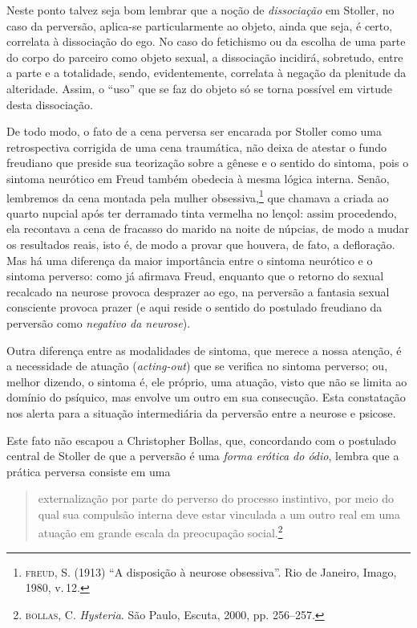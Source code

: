 Neste ponto talvez seja bom lembrar que a noção de \emph{dissociação} em
Stoller, no caso da perversão, aplica-se particularmente ao objeto,
ainda que seja, é certo, correlata à dissociação do ego. No caso do
fetichismo ou da escolha de uma parte do corpo do parceiro como objeto
sexual, a dissociação incidirá, sobretudo, entre a parte e a totalidade,
sendo, evidentemente, correlata à negação da plenitude da alteridade.
Assim, o ``uso'' que se faz do objeto só se torna possível em virtude
desta dissociação.

De todo modo, o fato de a cena perversa ser encarada por Stoller como
uma retrospectiva corrigida de uma cena traumática, não deixa de atestar
o fundo freudiano que preside sua teorização sobre a gênese e o sentido
do sintoma, pois o sintoma neurótico em Freud também obedecia à mesma
lógica interna. Senão, lembremos da cena montada pela mulher
obsessiva,\footnote{\textsc{freud}, S. (1913) ``A disposição à neurose
  obsessiva''.  Rio de Janeiro, Imago, 1980, v.\,12.} que
chamava a criada ao quarto nupcial após ter derramado tinta vermelha no
lençol: assim procedendo, ela recontava a cena de fracasso do marido na
noite de núpcias, de modo a mudar os resultados reais, isto é, de modo a
provar que houvera, de fato, a defloração. Mas há uma diferença da maior
importância entre o sintoma neurótico e o sintoma perverso: como já
afirmava Freud, enquanto que o retorno do sexual recalcado na neurose
provoca desprazer ao ego, na perversão a fantasia sexual consciente
provoca prazer (e aqui reside o sentido do postulado freudiano da
perversão como \emph{negativo da neurose}).

Outra diferença entre as modalidades de sintoma, que merece a nossa
atenção, é a necessidade de atuação (\emph{acting-out}) que se verifica
no sintoma perverso; ou, melhor dizendo, o sintoma é, ele próprio, uma
atuação, visto que não se limita ao domínio do psíquico, mas envolve um
outro em sua consecução. Esta constatação nos alerta para a situação
intermediária da perversão entre a neurose e psicose.

Este fato não escapou a Christopher Bollas, que, concordando com o
postulado central de Stoller de que a perversão é uma \emph{forma
erótica do ódio}, lembra que a prática perversa consiste em uma

\begin{quote}
externalização por parte do perverso do processo instintivo, por meio do
qual sua compulsão interna deve estar vinculada a um outro real em uma
atuação em grande escala da preocupação social.\footnote{\textsc{bollas},
  C. \emph{Hysteria}. São Paulo, Escuta, 2000, pp. 256--257.}
\end{quote}

